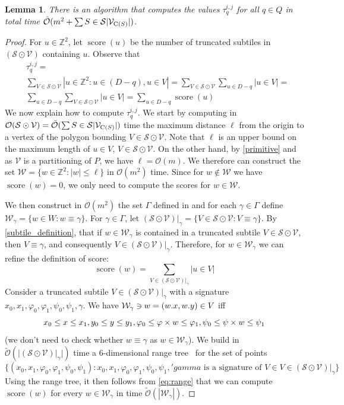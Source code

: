 \documentclass[11pt, letterpaper]{article}
\theoremstyle{plain}
\newtheorem{lemma}{Lemma}
\theoremstyle{definition}
\theoremstyle{remark}
\newcommand{\Z}{\mathbb{Z}}
\renewcommand{\O}{\mathcal{O}}
\newcommand{\tO}{\tilde{\mathcal{O}}}
\renewcommand{\S}{\mathcal{S}}
\newcommand{\V}{\mathcal{V}}
\renewcommand{\phi}{\varphi}
\DeclareMathOperator*{\score}{score}
\begin{document}
\newcommand{\W}{\mathcal{W}}
\begin{lemma}\label{primitive_conv}
There is an algorithm that computes the values $\tau_q^{i,j}$ for all $q \in Q$ in total time $\tO(m^2 + \sum{S \in \S} |\V_{\getchar{S}}|)$. 
\end{lemma}
\begin{proof}
For $u \in \Z^2$, let $\score(u)$ be the number of truncated subtiles in $(\S \odot \V)$ containing $u$. Observe that
%
\begin{equation}
\begin{split}
&\tau_q^{i,j} =\\
&\sum_{V \in \S \odot \V} |u \in \Z^2 : u \in (D-q), u \in V| = \sum_{V \in \S \odot \V} \sum_{u \in D-q}  |u \in V| =  \\
&\sum_{u \in D-q} \sum_{V \in \S \odot \V} |u \in V| = \sum_{u \in D-q} \score(u)
\end{split}
\end{equation}
We now explain how to compute $\tau_q^{i,j}$. We start by computing in $\O(\S \odot \V) = \tO(\sum{S \in \S} |\V_{\getchar{S}}|)$ time the maximum distance $\ell$ from the origin to a vertex of the polygon bounding $V \in \S \odot \V$. Note that $\ell$ is 
an upper bound on the maximum length of $u \in V$, $V \in \S \odot \V$. On the other hand, by \cref{primitive} and as $\V$ is a partitioning of $P$, we have $\ell = \O(m)$. We therefore can construct the set $\W = \{w \in \Z^2 : |w| \le \ell\}$ in $\O(m^2)$ time. Since for $w \notin \W$ we have $\score(w) = 0$, we only need to compute the scores for $w \in \W$. 

We then construct in $\O(m^2)$ the set $\Gamma$ defined in  and for each $\gamma \in \Gamma$ define $\W_\gamma = \{w \in W : w \equiv \gamma\}$. For $\gamma \in \Gamma$, let $(\S \odot \V) |_\gamma = \{V \in \S \odot \V : V \equiv \gamma\}$. By \cref{subtile_definition}, that if $w \in \W_\gamma$ is contained in a truncated subtile $V \in \S \odot \V$, then $V \equiv \gamma$, and consequently $V \in (\S \odot \V) |_\gamma$. Therefore, for $w \in \W_\gamma$ we can refine the definition of score:
%
$$\score(w) = \sum_{V \in (\S \odot \V) |_\gamma} |u \in V|$$
%
Consider a truncated subtile $V \in (\S \odot \V) |_\gamma$ with a signature $x_0, x_1, \phi_0, \phi_1, \psi_0, \psi_1, \gamma$. We have $\W_\gamma \ni w = (\x{w}, \y{w}) \in V$ iff 
\begin{equation}
\label{eq:range}
x_0 \le x \le x_1, y_0 \le y \le y_1, \phi_0 \le \h{w} \le \phi_1, \psi_0 \le \s{w} \le \psi_1
\end{equation}
(we don't need to check whether $w \equiv \gamma$ as $w \in \W_\gamma$). We build in $\tO(|(\S \odot \V) |_\gamma|)$ time a $6$-dimensional range tree~\cite{BENTLEY1979244} for the set of points 
%
$$\{(x_0, x_1, \phi_0, \phi_1, \psi_0, \psi_1) : x_0, x_1, \phi_0, \phi_1, \psi_0, \psi_1, 'gamma \text{ is a signature of } V \in V \in (\S \odot \V) |_\gamma\}$$
Using the range tree, it then follows from \cref{eq:range} that we can compute $\score(w)$ for every $w \in \W_\gamma$ in time $\tO(|\W_\gamma|)$. 


\end{proof}
\end{document}
